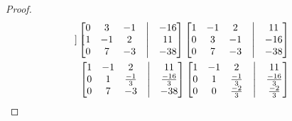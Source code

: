 \documentclass[12pt]{article}
\begin{document}
\begin{enumerate}
\begin{enumerate}
\begin{proof}
\begin{align*}
\begin{bmatrix}
                                            \end{bmatrix}
                                            \begin{bmatrix}
                                                    0 & 3  & -1 & \bigm| & -16 \\
                                                    1 & -1 & 2  & \bigm| & 11  \\
                                                    0 & 7  & -3 & \bigm| & -38 \\
                                            \end{bmatrix}
                                            \begin{bmatrix}
                                                    1 & -1 & 2  & \bigm| & 11  \\
                                                    0 & 3  & -1 & \bigm| & -16 \\
                                                    0 & 7  & -3 & \bigm| & -38 \\
                                            \end{bmatrix}
                                             &
                                            \\
                                            \begin{bmatrix}
                                                    1 & -1 & 2            & \bigm| & 11            \\
                                                    0 & 1  & \frac{-1}{3} & \bigm| & \frac{-16}{3} \\
                                                    0 & 7  & -3           & \bigm| & -38           \\
                                            \end{bmatrix}
                                            \begin{bmatrix}
                                                    1 & -1 & 2            & \bigm| & 11            \\
                                                    0 & 1  & \frac{-1}{3} & \bigm| & \frac{-16}{3} \\
                                                    0 & 0  & \frac{-2}{3} & \bigm| & \frac{-2}{3}  \\
                                            \end{bmatrix}

\end{align*}
\end{proof}
\end{enumerate}
\end{enumerate}
\end{document}
